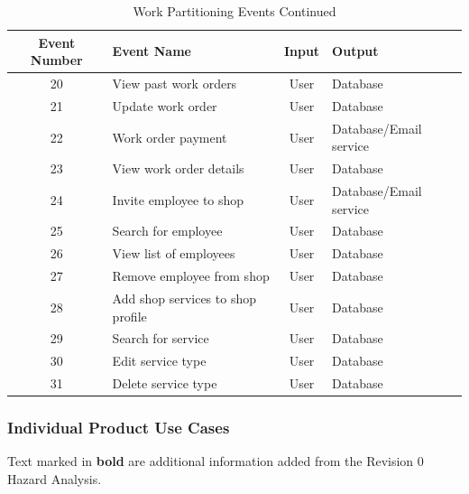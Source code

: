 \documentclass[12pt]{article}
\begin{document}
\begin{table}[H]
	\caption{Work Partitioning Events Continued}
	\centering
	\begin{tabular}{|c|p{3.5cm}|c|p{3.5cm}|}
		\hline
		\textbf{Event Number} & \centering\textbf{Event Name}     & \textbf{Input} & \textbf{Output}        \\
		\hline
		20                    & View past work orders             & User           & Database               \\
		\hline
		21                    & Update work order                 & User           & Database               \\
		\hline
		22                    & Work order payment                & User           & Database/Email service \\
		\hline
		23                    & View work order details           & User           & Database               \\
		\hline
		24                    & Invite employee to shop           & User           & Database/Email service \\
		\hline
		25                    & Search for employee               & User           & Database               \\
		\hline
		26                    & View list of employees            & User           & Database               \\
		\hline
		27                    & Remove employee from shop         & User           & Database               \\
		\hline
		28                    & Add shop services to shop profile & User           & Database               \\
		\hline
		29                    & Search for service                & User           & Database               \\
		\hline
		30                    & Edit service type                 & User           & Database               \\
		\hline
		31                    & Delete service type               & User           & Database               \\
		\hline
	\end{tabular}
\end{table}

\subsubsection{Individual Product Use Cases}
Text marked in \textbf{bold} are additional information added from the Revision 0 Hazard Analysis.
\end{document}
